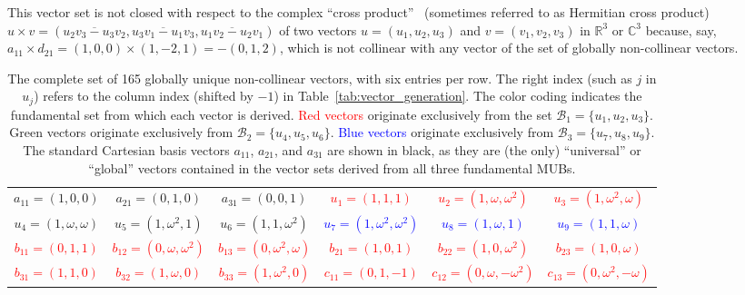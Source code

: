 \documentclass[%
  reprint,
  superscriptaddress,
  showpacs,
  showkeys,
  amsmath,amssymb,
  pra,
  longbibliography,
  floatfix,
  x11names
]{revtex4-2}
\begin{document}
This vector set is not closed with respect to the complex ``cross product''~\cite{harding2025remarksIJTP} (sometimes referred to as Hermitian cross product)
\(
u\times v =  (\overline{u_2v_3-u_3v_2},\overline{u_3v_1-u_1v_3},\overline{u_1v_2-u_2v_1})
\)
of two vectors $u=(u_1,u_2,u_3)$ and $v=(v_1,v_2,v_3)$ in $\mathbb{R}^3$ or $\mathbb{C}^3$ because, say,
$a_{11} \times d_{21} = (1,0,0) \times (1,-2,1) = -(0,1,2)$, which is not collinear with any vector of the set of globally non-collinear vectors.



\begin{table}[htbp!]
\caption{
The complete set of 165 globally unique non-collinear vectors, with six entries per row.
The right index (such as $j$ in $u_j$) refers to the column index (shifted by $-1$) in Table~\ref{tab:vector_generation}.
The color coding indicates the fundamental set from which each vector is derived.
\textcolor{red}{Red vectors} originate exclusively from the set $\mathcal{B}_1=\{u_1, u_2, u_3\}$.
\textcolor{green!40!black}{Green vectors} originate exclusively from $\mathcal{B}_2=\{u_4, u_5, u_6\}$.
\textcolor{blue}{Blue vectors} originate exclusively from $\mathcal{B}_3=\{u_7, u_8, u_9\}$.
The standard Cartesian basis vectors  $a_{11}$, $a_{21}$, and $a_{31}$  are shown in black, as they are
(the only) ``universal'' or ``global'' vectors contained in the vector sets derived from all three fundamental MUBs.
}
\label{tab:noncollinear_vectors_6col}
\footnotesize %
\begin{ruledtabular}
\begin{tabular}{*{6}{c}} %
{$a_{11}=(1,0,0)$} & {$a_{21}=(0,1,0)$} & {$a_{31}=(0,0,1)$} & \textcolor{red}{$u_{1}=(1,1,1)$} & \textcolor{red}{$u_{2}=(1,\omega,\omega^2)$} & \textcolor{red}{$u_{3}=(1,\omega^2,\omega)$} \\
\textcolor{green!40!black}{$u_{4}=(1,\omega,\omega)$} & \textcolor{green!40!black}{$u_{5}=(1,\omega^2,1)$} & \textcolor{green!40!black}{$u_{6}=(1,1,\omega^2)$} & \textcolor{blue}{$u_{7}=(1,\omega^2,\omega^2)$} & \textcolor{blue}{$u_{8}=(1,\omega,1)$} & \textcolor{blue}{$u_{9}=(1,1,\omega)$} \\
\textcolor{red}{$b_{11}=(0,1,1)$} & \textcolor{red}{$b_{12}=(0,\omega,\omega^2)$} & \textcolor{red}{$b_{13}=(0,\omega^2,\omega)$} & \textcolor{red}{$b_{21}=(1,0,1)$} & \textcolor{red}{$b_{22}=(1,0,\omega^2)$} & \textcolor{red}{$b_{23}=(1,0,\omega)$} \\
\textcolor{red}{$b_{31}=(1,1,0)$} & \textcolor{red}{$b_{32}=(1,\omega,0)$} & \textcolor{red}{$b_{33}=(1,\omega^2,0)$} & \textcolor{red}{$c_{11}=(0,1,-1)$} & \textcolor{red}{$c_{12}=(0,\omega,-\omega^2)$} & \textcolor{red}{$c_{13}=(0,\omega^2,-\omega)$} \\

\end{tabular}
\end{ruledtabular}
\end{table}
\end{document}
